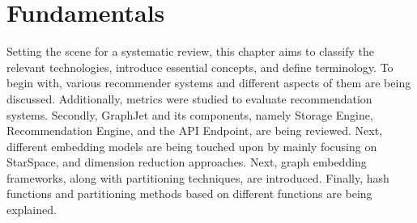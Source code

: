 \chapter{Fundamentals}
\label{chap:fundamentals}
Setting the scene for a systematic review, this chapter aims to classify the relevant technologies, introduce essential concepts, and define terminology. To begin with, various recommender systems and different aspects of them are being discussed. Additionally, metrics were studied to evaluate recommendation systems. Secondly, GraphJet and its components, namely Storage Engine, Recommendation Engine, and the API Endpoint, are being reviewed. Next, different embedding models are being touched upon by mainly focusing on StarSpace, and dimension reduction approaches. Next, graph embedding frameworks, along with partitioning techniques, are introduced. Finally, hash functions and partitioning methods based on different functions are being explained.
